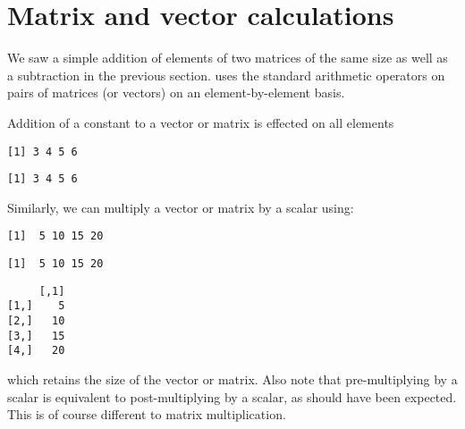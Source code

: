 \section{Matrix and vector calculations} 
 
We saw a simple addition of elements of two matrices of the same size as well as a subtraction in the previous section. \R{} uses the standard arithmetic operators on pairs of matrices (or vectors) on an element-by-element basis.  
 
Addition of a constant to a vector or matrix is effected on all elements 
\begin{knitrout}
\color{fgcolor}\begin{kframe}
\begin{alltt}
\hlstd{> }\hlopt{+}
\end{alltt}
\begin{verbatim}
[1] 3 4 5 6
\end{verbatim}
\begin{alltt}
\hlstd{> }\hlopt{+}
\end{alltt}
\begin{verbatim}
[1] 3 4 5 6
\end{verbatim}
\end{kframe}
\end{knitrout}
Similarly, we can multiply a vector or matrix by a scalar using: 
\begin{knitrout}
\color{fgcolor}\begin{kframe}
\begin{alltt}
\hlstd{> }\hlopt{*}
\end{alltt}
\begin{verbatim}
[1]  5 10 15 20
\end{verbatim}
\begin{alltt}
\hlstd{> }\hlopt{*}
\end{alltt}
\begin{verbatim}
[1]  5 10 15 20
\end{verbatim}
\begin{alltt}
\hlstd{> }\hlopt{*}
\end{alltt}
\begin{verbatim}
     [,1]
[1,]    5
[2,]   10
[3,]   15
[4,]   20
\end{verbatim}
\end{kframe}
\end{knitrout}
which retains the size of the vector or matrix. Also note that pre-multiplying by a scalar is equivalent to post-multiplying by a scalar, as should have been expected. This is of course different to matrix multiplication. 
 
